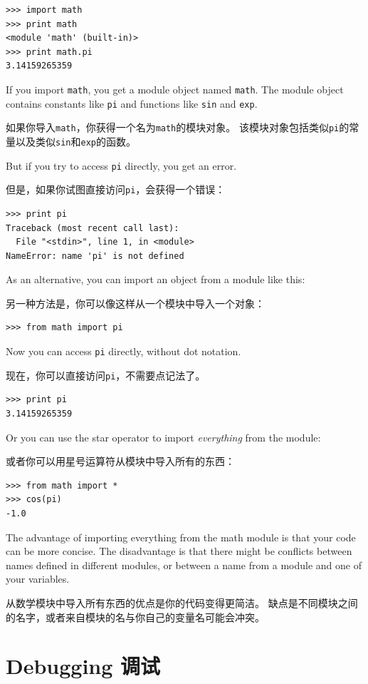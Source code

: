 \documentclass[10pt]{book}
\begin{document}
\begin{CJK}{UTF8}{gbsn}
\begin{verbatim}
>>> import math
>>> print math
<module 'math' (built-in)>
>>> print math.pi
3.14159265359
\end{verbatim}
%
If you import {\tt math}, you get a module object named {\tt math}.
The module object contains constants like {\tt pi} and functions
like {\tt sin} and {\tt exp}.

如果你导入{\tt math}，你获得一个名为{\tt math}的模块对象。
该模块对象包括类似{\tt pi}的常量以及类似{\tt sin}和{\tt exp}的函数。

But if you try to access {\tt pi} directly, you get an error.

但是，如果你试图直接访问{\tt pi}，会获得一个错误：

\begin{verbatim}
>>> print pi
Traceback (most recent call last):
  File "<stdin>", line 1, in <module>
NameError: name 'pi' is not defined
\end{verbatim}
%
As an alternative, you can import an object from a module like this:

另一种方法是，你可以像这样从一个模块中导入一个对象：

\begin{verbatim}
>>> from math import pi
\end{verbatim}
%
Now you can access {\tt pi} directly, without dot notation.

现在，你可以直接访问{\tt pi}，不需要点记法了。

\begin{verbatim}
>>> print pi
3.14159265359
\end{verbatim}
%
Or you can use the star operator to import {\it everything} from the
module:

或者你可以用星号运算符从模块中导入所有的东西：

\begin{verbatim}
>>> from math import *
>>> cos(pi)
-1.0
\end{verbatim}

The advantage of importing everything from the math module is that your
code can be more concise.  The disadvantage is that there might be
conflicts between names defined in different modules, or between
a name from a module and one of your variables.

从数学模块中导入所有东西的优点是你的代码变得更简洁。
缺点是不同模块之间的名字，或者来自模块的名与你自己的变量名可能会冲突。


\section{Debugging 调试}
\label{editor}


\end{CJK}
\end{document}
